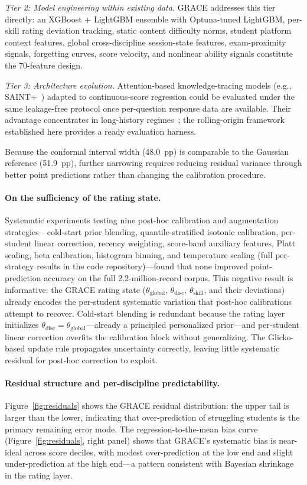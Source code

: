 \documentclass[11pt]{article}
\begin{document}
\textit{Tier 2: Model engineering within existing data.}\quad
GRACE addresses this tier directly: an XGBoost + LightGBM ensemble with Optuna-tuned
LightGBM, per-skill rating deviation tracking, static content difficulty norms, student
platform context features, global cross-discipline session-state features, exam-proximity
signals, forgetting curves, score velocity, and nonlinear ability signals constitute the 70-feature design.

\textit{Tier 3: Architecture evolution.}\quad
Attention-based knowledge-tracing models (e.g., SAINT+~\cite{shin2021}) adapted
to continuous-score regression could be evaluated under the same leakage-free protocol
once per-question response data are available.
Their advantage concentrates in long-history regimes~\cite{liu2021}; the rolling-origin
framework established here provides a ready evaluation harness.

Because the conformal interval width (48.0~pp) is comparable to the Gaussian
reference (51.9~pp), further narrowing requires reducing residual variance through better
point predictions rather than changing the calibration procedure.

\paragraph{On the sufficiency of the rating state.}
Systematic experiments testing nine post-hoc calibration and augmentation strategies---cold-start
prior blending, quantile-stratified isotonic calibration, per-student linear correction,
recency weighting, score-band auxiliary features, Platt scaling, beta calibration,
histogram binning, and temperature scaling (full per-strategy results in the code repository)---found that none
improved point-prediction accuracy on the full 2.2-million-record corpus.
This negative result is informative: the GRACE rating state ($\theta_{\text{global}}$,
$\theta_{\text{disc}}$, $\theta_{\text{skill}}$, and their deviations) already encodes
the per-student systematic variation that post-hoc calibrations attempt to recover.
Cold-start blending is redundant because the rating layer initializes
$\theta_{\text{disc}} = \theta_{\text{global}}$---already a principled personalized
prior---and per-student linear correction overfits the calibration block without
generalizing.
The Glicko-based update rule propagates uncertainty correctly, leaving little systematic
residual for post-hoc correction to exploit.

\paragraph{Residual structure and per-discipline predictability.}
Figure~\ref{fig:residuals} shows the GRACE residual distribution:
the upper tail is larger than the lower, indicating that over-prediction of
struggling students is the primary remaining error mode.
The regression-to-the-mean bias curve (Figure~\ref{fig:residuals}, right panel)
shows that GRACE's systematic bias is near-ideal across score deciles,
with modest over-prediction at the low end and slight under-prediction at
the high end---a pattern consistent with Bayesian shrinkage in the rating layer.
\end{document}
